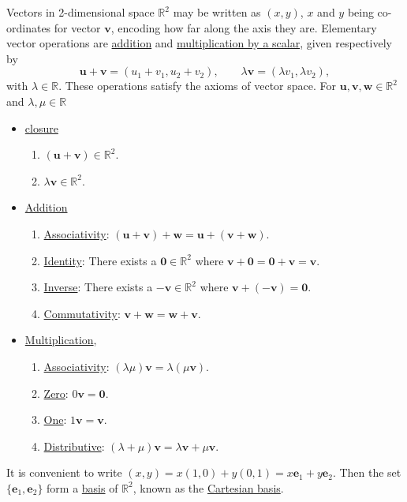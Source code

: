 \documentclass[10pt,notitlepage]{revtex4-1}
\newcommand{\eb}{\boldsymbol{e}}
\newcommand{\ub}{\boldsymbol{u}}
\newcommand{\vb}{\boldsymbol{v}}
\newcommand{\wb}{\boldsymbol{w}}
\begin{document}
Vectors in 2-dimensional space $\mathbb{R}^{2}$ may be written as $(x,y)$, $x$
and $y$ being co-ordinates for vector $\vb$, encoding how far along the axis
they are. Elementary vector operations are \underline{addition} and
\underline{multiplication by a scalar}, given respectively by
\begin{equation}
	\ub+\vb=(u_1 + v_1, u_2 + v_2),\qquad 
	\lambda\vb=(\lambda v_1, \lambda v_2),
\end{equation}
with $\lambda\in\mathbb{R}$. These operations satisfy the axioms of vector
space. For $\ub,\vb,\wb\in\mathbb{R}^2$ and $\lambda,\mu\in\mathbb{R}$
\begin{itemize}
	\item \underline{closure}
	\begin{enumerate}
		\item $(\ub+\vb)\in\mathbb{R}^2$.
		\item $\lambda\vb\in\mathbb{R}^2$.
	\end{enumerate}
	\item \underline{Addition}
	\begin{enumerate}
		\item \underline{Associativity}: $(\ub+\vb)+\wb=\ub+(\vb+\wb)$.
		\item \underline{Identity}: There exists a $\mathbf{0}\in\mathbb{R}^2$
		where $\vb+\mathbf{0}=\mathbf{0}+\vb=\vb$.
		\item \underline{Inverse}: There exists a $-\vb\in\mathbb{R}^2$ where
		$\vb+(-\vb)=\mathbf{0}$.
		\item \underline{Commutativity}: $\vb+\wb=\wb+\vb$.
	\end{enumerate}
	\item \underline{Multiplication},
	\begin{enumerate}
		\item \underline{Associativity}: $(\lambda\mu)\vb=\lambda(\mu\vb)$.
		\item \underline{Zero}: $0\vb=\mathbf{0}$.
		\item \underline{One}: $1\vb=\vb$.
		\item \underline{Distributive}: $(\lambda+\mu)\vb=\lambda\vb+\mu\vb$.
	\end{enumerate}
\end{itemize}

It is convenient to write $(x,y)=x(1,0)+y(0,1)=x\eb_1 + y\eb_2$. Then the set
$\{\eb_1,\eb_2\}$ form a \underline{basis} of $\mathbb{R}^2$, known as the
\underline{Cartesian basis}.

\end{document}
